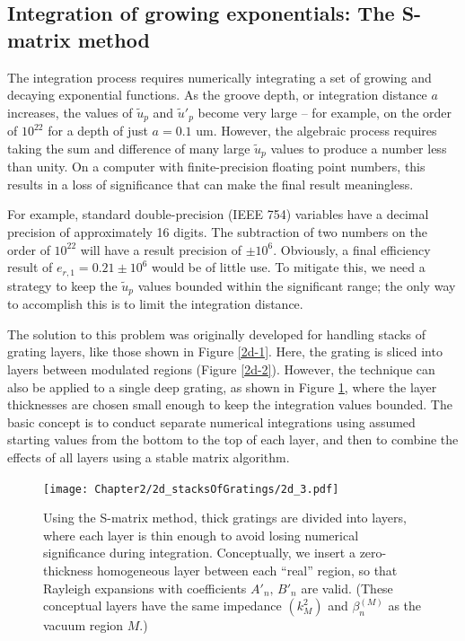 \subsection{Integration of growing exponentials: The S-matrix method}
\label{SMatrixMethod}
The integration process  requires numerically integrating a set of growing and decaying exponential functions.  As the groove depth, or integration distance $a$ increases, the values of $\tilde u_p$ and $\tilde u'_p$ become very large -- for example, on the order of $10^{22}$ for a depth of just $a = 0.1$ um.  However, the algebraic process  requires taking the sum and difference of many large $\tilde u_p$ values to produce a number less than unity.  On a computer with finite-precision floating point numbers, this results in a loss of significance that can make the final result meaningless.

For example, standard double-precision (IEEE 754) variables have a decimal precision of approximately 16 digits.  The subtraction of two numbers on the order of $10^{22}$ will have a result precision of $\pm10^6$.  Obviously, a final efficiency result of $e_{r,1} = 0.21 \pm 10^6$ would be of little use.  To mitigate this, we need a strategy to keep the $\tilde u_p$ values bounded within the significant range; the only way to accomplish this is to limit the integration distance.

The solution to this problem was originally developed for handling stacks of grating layers, like those shown in Figure \ref{2d-1}.  Here, the grating is sliced into layers between modulated regions (Figure \ref{2d-2}).  However, the technique can also be applied to a single deep grating, as shown in Figure \ref{2d-3}, where the layer thicknesses are chosen small enough to keep the integration values bounded.  The basic concept is to conduct separate numerical integrations using assumed starting values from the bottom to the top of each layer, and then to combine the effects of all layers using a stable matrix algorithm.

\begin{figure}[htbp] %
   \centering
   \texttt{[image: Chapter2/2d\_stacksOfGratings/2d\_3.pdf]} 
   \caption[Using the S-matrix method, thick gratings are divided into layers, where each layer is thin enough to avoid losing numerical significance during integration.]{Using the S-matrix method, thick gratings are divided into layers, where each layer is thin enough to avoid losing numerical significance during integration.  Conceptually, we insert a zero-thickness homogeneous layer between each ``real'' region, so that Rayleigh expansions with coefficients $A'_n,\, B'_n$ are valid.  (These conceptual layers have the same impedance $(k_M^2)$ and $\beta_n^{(M)}$ as the vacuum region $M$.)}
   \label{2d-3}
\end{figure}


